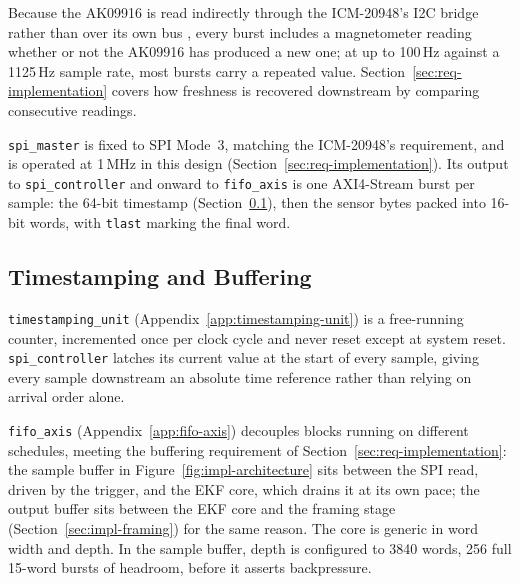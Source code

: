 \documentclass[12pt,a4paper]{article}
\begin{document}
{Because the AK09916 is read indirectly through the ICM-20948's I2C
bridge rather than over its own bus \cite{akm_ak09916_ds}, every burst
includes a magnetometer reading whether or not the AK09916 has produced
a new one; at up to 100\,Hz against a 1125\,Hz sample rate, most bursts
carry a repeated value. Section~\ref{sec:req-implementation} covers how
freshness is recovered downstream by comparing consecutive readings.

\texttt{spi\_master} is fixed to SPI Mode~3, matching the ICM-20948's
requirement, and is operated at 1\,MHz in this design
(Section~\ref{sec:req-implementation}). Its output to
\texttt{spi\_controller} and onward to \texttt{fifo\_axis} is one
AXI4-Stream burst per sample: the 64-bit timestamp
(Section~\ref{sec:impl-timestamp-fifo}), then the sensor bytes packed
into 16-bit words, with \texttt{tlast} marking the final word.

\subsection{Timestamping and Buffering}
\label{sec:impl-timestamp-fifo}

\texttt{timestamping\_unit} (Appendix~\ref{app:timestamping-unit}) is a
free-running counter, incremented once per clock cycle and never reset
except at system reset. \texttt{spi\_controller} latches its current
value at the start of every sample, giving every sample downstream an
absolute time reference rather than relying on arrival order alone.

\texttt{fifo\_axis} (Appendix~\ref{app:fifo-axis}) decouples blocks
running on different schedules, meeting the buffering requirement of
Section~\ref{sec:req-implementation}: the sample buffer in
Figure~\ref{fig:impl-architecture} sits between the SPI read, driven by
the trigger, and the EKF core, which drains it at its own pace; the
output buffer sits between the EKF core and the framing stage
(Section~\ref{sec:impl-framing}) for the same reason. The core is
generic in word width and depth. In the sample buffer, depth is
configured to 3840 words, 256 full 15-word bursts of headroom, before it
asserts backpressure.

}
\end{document}
